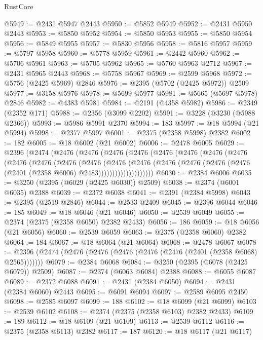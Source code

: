 \begin{lexlean}{RustCore}
\begin{coremodule}
@5949 := @2431 @5947 @2443
@5950 := @5852 @5949
@5952 := @2431 @5950 @2443
@5953 := @5850 @5952
@5954 := @5850 @5953
@5955 := @5850 @5954
@5956 := @5849 @5955
@5957 := @5830 @5956
@5958 := @5816 @5957
@5959 := @5797 @5958
@5960 := @5778 @5959
@5961 := @2442 @5960
@5962 := @5706 @5961
@5963 := @5705 @5962
@5965 := @5760 @5963 @2712
@5967 := @2431 @5965 @2443
@5968 := @5758 @5967
@5969 := @2599 @5968
@5972 := @5756 (@2425 @5969) @2846
@5976 := @2395 (@5702 (@2425 @5972)) @2509
@5977 := @3158 @5976
@5978 := @5699 @5977
@5981 := @5665 (@5697 @5978) @2846
@5982 := @4383 @5981
@5984 := @2191 (@4358 @5982)
@5986 := @2349 (@2352 @171)
@5988 := @2356 (@3099 @2202)
@5991 := @3228 (@3230 (@5988 @2366))
@5993 := @5986 @5991 @2370
@5994 := 183
@5997 := @18 @5994 (@21 @5994)
@5998 := @2377 @5997
@6001 := @2375 (@2358 @5998) @2382
@6002 := 182
@6005 := @18 @6002 (@21 @6002)
@6006 := @2478 @6005
@6029 := @2396
    (@2474
      (@2476
        (@2476
          (@2476
            (@2476
              (@2476
                (@2476
                  (@2476
                    (@2476
                      (@2476
                        (@2476
                          (@2476
                            (@2476
                              (@2476
                                (@2476
                                  (@2476
                                    (@2476
                                      (@2476 (@2476 (@2401 (@2358 @6006) @2483))))))))))))))))))))
@6030 := @2384 @6006
@6035 := @3250 (@2395 (@6029 (@2425 @6030)) @2509)
@6038 := @2374 (@6001 @6035) @2388
@6039 := @2372 @6038
@6041 := @2391 (@2384 @5998)
@6043 := @2395 (@2519 @2846)
@6044 := @2533 @2409
@6045 := @2396 @6044
@6046 := 185
@6049 := @18 @6046 (@21 @6046)
@6050 := @2539 @6049
@6055 := @2374 (@2375 (@2358 @6050) @2382 @2433)
@6056 := 186
@6059 := @18 @6056 (@21 @6056)
@6060 := @2539 @6059
@6063 := @2375 (@2358 @6060) @2382
@6064 := 184
@6067 := @18 @6064 (@21 @6064)
@6068 := @2478 @6067
@6078 := @2396 (@2474 (@2476 (@2476 (@2476 (@2476 (@2476 (@2401 (@2358 @6068) @2565)))))))
@6079 := @2384 @6068
@6084 := @3250 (@2395 (@6078 (@2425 @6079)) @2509)
@6087 := @2374 (@6063 @6084) @2388
@6088 := @6055 @6087
@6089 := @2372 @6088
@6091 := @2431 (@2384 @6050)
@6094 := @2431 (@2384 @6060) @2443
@6095 := @6091 @6094
@6097 := @2589 @6095 @2450
@6098 := @2585 @6097
@6099 := 188
@6102 := @18 @6099 (@21 @6099)
@6103 := @2539 @6102
@6108 := @2374 (@2375 (@2358 @6103) @2382 @2433)
@6109 := 189
@6112 := @18 @6109 (@21 @6109)
@6113 := @2539 @6112
@6116 := @2375 (@2358 @6113) @2382
@6117 := 187
@6120 := @18 @6117 (@21 @6117)

\end{coremodule}
\end{lexlean}
